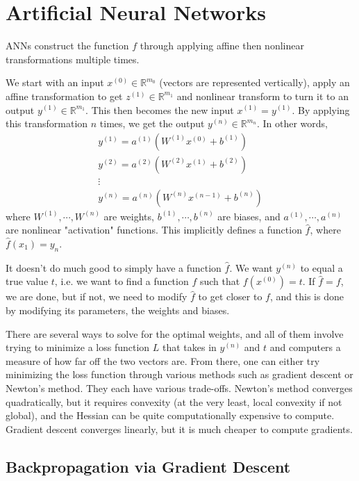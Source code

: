 \documentclass{article}
\begin{document}
	\section{Artificial Neural Networks}	
	ANNs construct the function \( f \) through applying affine then nonlinear transformations multiple times.
	
	We start with an input \( x^{(0)} \in \mathbb{R}^{m_0} \) (vectors are represented vertically), apply an affine transformation to get \( z^{(1)} \in \mathbb{R}^{m_1} \) and nonlinear transform to turn it to an output \( y^{(1)} \in \mathbb{R}^{m_1} \). This then becomes the new input \( x^{(1)} = y^{(1)} \). By applying this transformation \(n\) times, we get the output \( y^{(n)} \in \mathbb{R}^{m_n} \). In other words,
	\begin{gather*}
		y^{(1)} = a^{(1)}(W^{(1)} x^{(0)} + b^{(1)}) \\
		y^{(2)} = a^{(2)}(W^{(2)} x^{(1)} + b^{(2)}) \\
		\vdots \\
		y^{(n)} = a^{(n)}(W^{(n)} x^{(n-1)} + b^{(n)})
	\end{gather*}
	where \( W^{(1)}, \cdots, W^{(n)} \) are weights, \( b^{(1)}, \cdots, b^{(n)} \) are biases, and \( a^{(1)}, \cdots, a^{(n)} \) are nonlinear "activation" functions. This implicitly defines a function \( \hat{f} \), where \(\hat{f}(x_1) = y_n \).
	
	It doesn't do much good to simply have a function \( \hat{f} \). We want \( y^{(n)} \) to equal a true value \( t \), i.e. we want to find a function \( f \) such that \( f(x^{(0)}) = t \). If \( \hat{f} = f \), we are done, but if not, we need to modify \( \hat{f} \) to get closer to \( f \), and this is done by modifying its parameters, the weights and biases.
	
	There are several ways to solve for the optimal weights, and all of them involve trying to minimize a loss function \( L \) that takes in \( y^{(n)} \) and \( t \) and computers a measure of how far off the two vectors are. From there, one can either try minimizing the loss function through various methods such as gradient descent or Newton's method. They each have various trade-offs. Newton's method converges quadratically, but it requires convexity (at the very least, local convexity if not global), and the Hessian can be quite computationally expensive to compute. Gradient descent converges linearly, but it is much cheaper to compute gradients.
	
	\subsection{Backpropagation via Gradient Descent}
	
\end{document}
